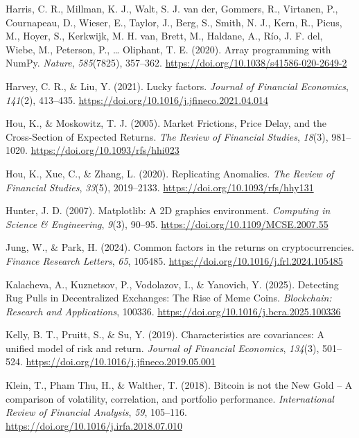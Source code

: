 \documentclass[
  12pt,
  a4paper,
  openany]{scrbook}
\newlength{\cslhangindent}
\newenvironment{CSLReferences}[2] %
 {\begin{list}{}{%
  \setlength{\itemindent}{0pt}
  \setlength{\leftmargin}{0pt}
  \setlength{\parsep}{0pt}
  \ifodd #1
   \setlength{\leftmargin}{\cslhangindent}
   \setlength{\itemindent}{-1\cslhangindent}
  \fi
  \setlength{\itemsep}{#2\baselineskip}}}
 {\end{list}}
\begin{document}
\begin{CSLReferences}{1}{0}
Harris, C. R., Millman, K. J., Walt, S. J. van der, Gommers, R.,
Virtanen, P., Cournapeau, D., Wieser, E., Taylor, J., Berg, S., Smith,
N. J., Kern, R., Picus, M., Hoyer, S., Kerkwijk, M. H. van, Brett, M.,
Haldane, A., Río, J. F. del, Wiebe, M., Peterson, P., \ldots{} Oliphant,
T. E. (2020). Array programming with {NumPy}. \emph{Nature},
\emph{585}(7825), 357--362.
\url{https://doi.org/10.1038/s41586-020-2649-2}

Harvey, C. R., \& Liu, Y. (2021). Lucky factors. \emph{Journal of
Financial Economics}, \emph{141}(2), 413--435.
\url{https://doi.org/10.1016/j.jfineco.2021.04.014}

Hou, K., \& Moskowitz, T. J. (2005). Market Frictions, Price Delay, and
the Cross-Section of Expected Returns. \emph{The Review of Financial
Studies}, \emph{18}(3), 981--1020.
\url{https://doi.org/10.1093/rfs/hhi023}

Hou, K., Xue, C., \& Zhang, L. (2020). Replicating Anomalies. \emph{The
Review of Financial Studies}, \emph{33}(5), 2019--2133.
\url{https://doi.org/10.1093/rfs/hhy131}

Hunter, J. D. (2007). Matplotlib: A 2D graphics environment.
\emph{Computing in Science \& Engineering}, \emph{9}(3), 90--95.
\url{https://doi.org/10.1109/MCSE.2007.55}

Jung, W., \& Park, H. (2024). Common factors in the returns on
cryptocurrencies. \emph{Finance Research Letters}, \emph{65}, 105485.
\url{https://doi.org/10.1016/j.frl.2024.105485}

Kalacheva, A., Kuznetsov, P., Vodolazov, I., \& Yanovich, Y. (2025).
Detecting Rug Pulls in Decentralized Exchanges: The Rise of Meme Coins.
\emph{Blockchain: Research and Applications}, 100336.
\url{https://doi.org/10.1016/j.bcra.2025.100336}

Kelly, B. T., Pruitt, S., \& Su, Y. (2019). Characteristics are
covariances: A unified model of risk and return. \emph{Journal of
Financial Economics}, \emph{134}(3), 501--524.
\url{https://doi.org/10.1016/j.jfineco.2019.05.001}

Klein, T., Pham Thu, H., \& Walther, T. (2018). Bitcoin is not the New
Gold -- A comparison of volatility, correlation, and portfolio
performance. \emph{International Review of Financial Analysis},
\emph{59}, 105--116. \url{https://doi.org/10.1016/j.irfa.2018.07.010}


\end{CSLReferences}
\end{document}
